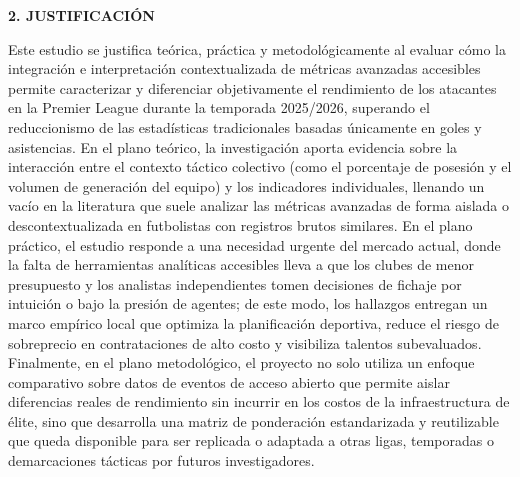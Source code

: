 \hypertarget{sec:justificacion}{}%
\begin{center}
    {\Large\bfseries 2. JUSTIFICACIÓN}
\end{center}
\vspace{1em}

Este estudio se justifica teórica, práctica y metodológicamente al evaluar cómo la integración e interpretación contextualizada de métricas avanzadas accesibles permite caracterizar y diferenciar objetivamente el rendimiento de los atacantes en la Premier League durante la temporada 2025/2026, superando el reduccionismo de las estadísticas tradicionales basadas únicamente en goles y asistencias. En el plano teórico, la investigación aporta evidencia sobre la interacción entre el contexto táctico colectivo (como el porcentaje de posesión y el volumen de generación del equipo) y los indicadores individuales, llenando un vacío en la literatura que suele analizar las métricas avanzadas de forma aislada o descontextualizada en futbolistas con registros brutos similares. En el plano práctico, el estudio responde a una necesidad urgente del mercado actual, donde la falta de herramientas analíticas accesibles lleva a que los clubes de menor presupuesto y los analistas independientes tomen decisiones de fichaje por intuición o bajo la presión de agentes; de este modo, los hallazgos entregan un marco empírico local que optimiza la planificación deportiva, reduce el riesgo de sobreprecio en contrataciones de alto costo y visibiliza talentos subevaluados. Finalmente, en el plano metodológico, el proyecto no solo utiliza un enfoque comparativo sobre datos de eventos de acceso abierto que permite aislar diferencias reales de rendimiento sin incurrir en los costos de la infraestructura de élite, sino que desarrolla una matriz de ponderación estandarizada y reutilizable que queda disponible para ser replicada o adaptada a otras ligas, temporadas o demarcaciones tácticas por futuros investigadores.